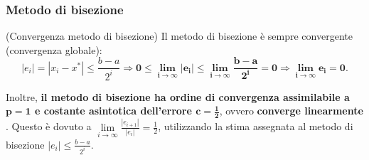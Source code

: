 \subsubsection{Metodo di bisezione}\label{ssec:convergenza_metodo_bisezione}
\begin{remark}(Convergenza metodo di bisezione)
	Il metodo di bisezione è sempre convergente (convergenza globale): 
	\begin{equation*}
		|e_i|=|x_i-x^*|\leq \frac{b-a}{2^i}\Rightarrow \boldsymbol{0\leq \lim_{i\to\infty}|e_i|\leq \lim_{i\to\infty}{\frac{b-a}{2^i}=0}\Rightarrow \lim_{i\to\infty}{e_i}=0.}
	\end{equation*}
\end{remark}

\noindent Inoltre, \textbf{il metodo di bisezione ha ordine di convergenza assimilabile a $\boldsymbol{p=1}$ e costante asintotica dell'errore $\boldsymbol{c=\frac{1}{2}}$}, ovvero \textbf{converge linearmente} \footnotemark. Questo è dovuto a $\underset{{i\to\infty}}{\lim}{\frac{|e_{i+1}|}{|e_i|}}=\frac{1}{2}$, utilizzando la stima assegnata al metodo di bisezione $|e_i|\leq\frac{b-a}{2^i}$.


